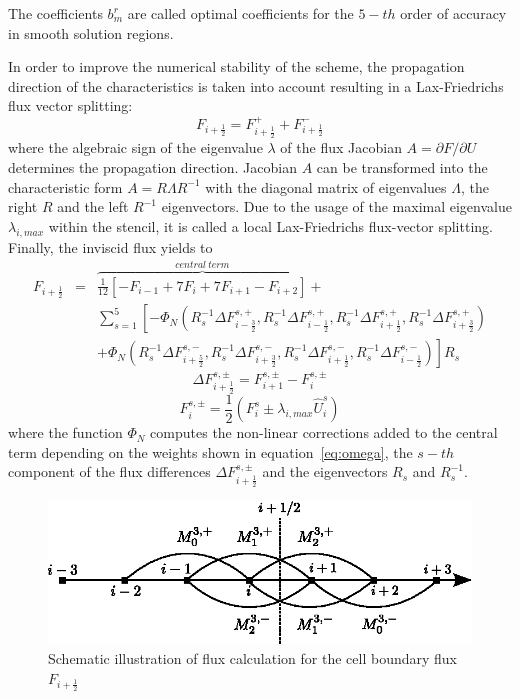 The coefficients $b_m^r$ are called optimal coefficients for the $5-th$ order of accuracy in smooth solution regions.
\par
In order to improve the numerical stability of the scheme, the propagation direction of the characteristics is taken into account resulting in a Lax-Friedrichs flux vector splitting:
\begin{equation}
F_{i + \frac{1}{2}}=F^{+}_{i + \frac{1}{2}}+F^{-}_{i + \frac{1}{2}}
\label{eq:lfs}
\end{equation}
where the algebraic sign of the eigenvalue $\lambda$ of the flux Jacobian $A=\partial F/ \partial U$ determines the propagation direction. 
Jacobian $A$ can be transformed into the characteristic form $A=R\Lambda R^{-1}$ with the diagonal matrix of eigenvalues $\Lambda$, the right $R$ and the left $R^{-1}$ eigenvectors.
Due to the usage of the maximal eigenvalue $\lambda_{i,max}$ within the stencil, it is called a local Lax-Friedrichs flux-vector splitting.
Finally, the inviscid flux yields to
\begin{eqnarray}
F_{i+\frac{1}{2}}& =&\overbrace{\frac{1}{12}\left[ -F_{i-1}+7F_{i}+7F_{i+1}-F_{i+2} \right]}^{central\ term} + \nonumber \\
& &\sum_{s=1}^{5}\left[ -\Phi_N \left( 
R^{-1}_{s}\varDelta F^{s,+}_{i-\frac{3}{2}},
R^{-1}_{s} \varDelta F^{s,+}_{i-\frac{1}{2}},
R^{-1}_{s} \varDelta F^{s,+}_{i+\frac{1}{2}},
R^{-1}_{s} \varDelta F^{s,+}_{i+\frac{3}{2}}
\right) \right. \\
& &\left. +\Phi_N \left( 
R^{-1}_{s} \varDelta F^{s,-}_{i+\frac{5}{2}},
R^{-1}_{s} \varDelta F^{s,-}_{i+\frac{3}{2}},
R^{-1}_{s} \varDelta F^{s,-}_{i+\frac{1}{2}},
R^{-1}_{s} \varDelta F^{s,-}_{i-\frac{1}{2}}
\right) \right] R_{s} \nonumber
\end{eqnarray}
\begin{equation}
\varDelta F^{s,\pm}_{i+\frac{1}{2}}=F^{s,\pm}_{i+1}-F^{s,\pm}_{i}
\end{equation}
\begin{equation}
F^{s,\pm}_{i}=\frac{1}{2}\left(F^s_{i} \pm \lambda_{i,max} \hat{U}^s_{i} \right)
\end{equation}
where the function $\Phi_N$ computes the non-linear corrections added to the central term depending on the weights shown in equation~\eqref{eq:omega}, the $s-th$ component of the flux differences $\varDelta F^{s,\pm}_{i+\frac{1}{2}}$ and the eigenvectors $R_s$ and $R^{-1}_s$.
\begin{figure}[!ht]
  \begin{center} 
    \includegraphics[width=0.75\linewidth]{stencil_weno5}
  \end{center}
  \caption {Schematic illustration of flux calculation for the cell boundary flux $F_{i + \frac{1}{2}}$}
  \label{fig:fluxcalculation}
\end{figure}
